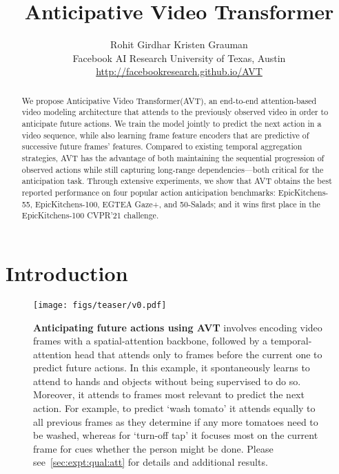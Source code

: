 \documentclass[10pt,twocolumn,letterpaper]{article}
\newcommand{\eknewfull}{EpicKitchens-100\xspace}
\newcommand{\ekfull}{EpicKitchens-55\xspace}
\newcommand{\saladfull}{50-Salads\xspace}
\newcommand{\egtea}{EGTEA Gaze+\xspace}
\newcommand{\methodfull}{Anticipative Video Transformer\xspace}
\newcommand{\method}{AVT\xspace}
\begin{document}
\title{\methodfull}

\author{
Rohit Girdhar \qquad Kristen Grauman \\
{Facebook AI Research \quad University of Texas, Austin} \\
{\small \url{http://facebookresearch.github.io/AVT}}
}




\maketitle
\ificcvfinal\thispagestyle{empty}\fi

\begin{abstract}
    We propose \methodfull (\method), an end-to-end attention-based video modeling architecture that
attends to the previously observed video in order to anticipate future actions.  We train the model jointly to predict the next action in a video sequence, while also learning frame feature encoders that are 
    predictive
    of successive future frames' features.  Compared to existing temporal aggregation strategies, \method has the advantage of both maintaining the sequential progression of observed actions while still capturing long-range dependencies---both critical for the anticipation task. Through extensive experiments, we show that
    \method obtains the best reported performance on four popular
    action anticipation benchmarks: \ekfull, \eknewfull, \egtea, and \saladfull; and it wins first place
    in the \eknewfull CVPR'21 challenge.
\end{abstract} \section{Introduction}

\begin{figure}[t]
    \centering
\texttt{[image: figs/teaser/v0.pdf]}  \vspace*{-0.25in}
    \caption{
        {\bf Anticipating future actions using \method}
        involves encoding video frames with a spatial-attention backbone, followed by 
        a temporal-attention head that attends only to frames before the current one to predict future actions.
In this example, it spontaneously learns to attend to hands and objects without being supervised to do so. Moreover, it attends to frames most relevant to predict the next action.
For example, to predict `wash tomato' it attends equally to all previous frames as they determine if any more tomatoes need to be washed, whereas for
        `turn-off tap' it focuses most on the current frame for cues whether the person might be done. Please see~\cref{sec:expt:qual:att} for details and additional results.
    }
    \label{fig:teaser}
\end{figure}
 
\end{document}
